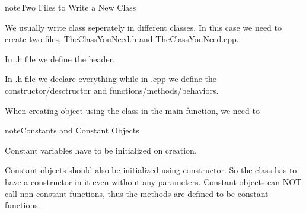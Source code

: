 \documentclass[letterpaper,12pt,english]{sphinxmanual}
\begin{document}
\begin{sphinxadmonition}{note}{Two Files to Write a New Class}

We usually write class seperately in different classes. In this case we need to create two files, TheClassYouNeed.h and TheClassYouNeed.cpp.

In .h file we define the header.

\begin{sphinxVerbatim}[commandchars=\\\{\}]


\end{sphinxVerbatim}

In .h file we declare everything while in .cpp we define the constructor/desctructor and functions/methods/behaviors.

When creating object using the class in the main function, we need to

\begin{sphinxVerbatim}[commandchars=\\\{\}]
 
\end{sphinxVerbatim}
\end{sphinxadmonition}

\begin{sphinxadmonition}{note}{Constants and Constant Objects}

Constant variables have to be initialized on creation.

Constant objects should also be initialized using constructor. So the class has to have a constructor in it even without any parameters. Constant objects can NOT call non-constant functions, thus the methods are defined to be constant functions.

\begin{sphinxVerbatim}[commandchars=\\\{\}]

  


   
    
\end{sphinxVerbatim}
\end{sphinxadmonition}
\end{document}
